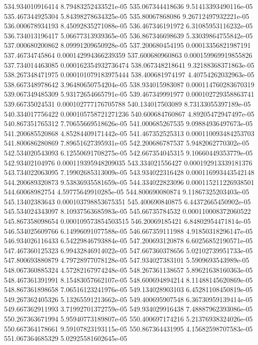 {534.934010916414 8.79483252433521e-05
535.067344418636 9.51413393490116e-05
535.467344925304 5.84398278634325e-05
535.80067868086 9.26712497932221e-05
536.000678934193 8.45092835271088e-05
536.467346191972 6.31085953116232e-05
536.734013196417 5.06677313939365e-05
536.867346698639 5.33039864755842e-05
537.000680200862 8.09991209650928e-05
537.200680454195 0.00013356821987191
537.46734745864 0.000142994366239359
537.600680960863 0.000159969919855826
537.734014463085 0.000162354932736474
538.067348218641 9.32188368371863e-05
538.267348471975 0.000101079183975444
538.400681974197 4.40754262032963e-05
538.667348978642 3.96480650754204e-05
538.934015983087 0.000114760283670319
539.067349485309 5.93172654665791e-05
539.467349991977 0.000102729358863741
539.66735024531 0.000102777176705788
540.134017503089 8.73133055397189e-05
540.334017756422 0.000105758721271236
540.600684760867 4.89205472947497e-05
540.867351765312 7.70655669518626e-05
541.000685267535 9.09884936497673e-05
541.200685520868 4.85284409171442e-05
541.467352525313 0.000110093484253703
541.800686280869 7.89651627395931e-05
542.200686787537 5.9482062770302e-05
542.534020543093 6.12550691708275e-05
542.667354045315 9.10660449353779e-05
542.93402104976 0.000119395948209035
543.334021556427 0.000192913339181376
543.734022063095 7.19902685313009e-05
543.934022316428 0.000116993443542148
544.200689320873 9.53836935581659e-05
544.334022823096 0.000115211226938501
544.60068982754 4.59775649910285e-05
544.800690080874 9.11867325203403e-05
545.13402383643 0.000103798853675351
545.400690840875 6.44372665450902e-05
545.534024343097 8.10937563685983e-05
545.66735784532 0.000110008372060522
545.867358098654 0.000109573854503515
546.20069185421 6.84802954471814e-05
546.534025609766 6.14996091077588e-05
546.667359111988 4.91850318296147e-05
546.934026116433 6.54229846793884e-05
547.200693120878 6.60256852190571e-05
547.467360125323 6.99432846914022e-05
547.667360378656 5.02102739951733e-05
547.800693880879 4.79728977078128e-05
547.934027383101 5.5909693543989e-05
548.067360885324 4.57282167974248e-05
548.267361138657 5.89621638160363e-05
548.467361391991 8.15483057662107e-05
548.600694894214 8.11488145620869e-05
548.867361898658 7.06516123241976e-05
549.134028903103 6.45281108450819e-05
549.267362405326 5.13265591213662e-05
549.400695907548 6.36730959139414e-05
549.667362911993 3.71992701372759e-05
549.934029916438 7.48887962393086e-05
550.267363671994 5.95940773189807e-05
550.400697174216 5.21376938324026e-05
550.667364178661 9.59107823193115e-05
550.867364431995 4.15682598707583e-05
551.067364685329 5.02925581602645e-05
}
